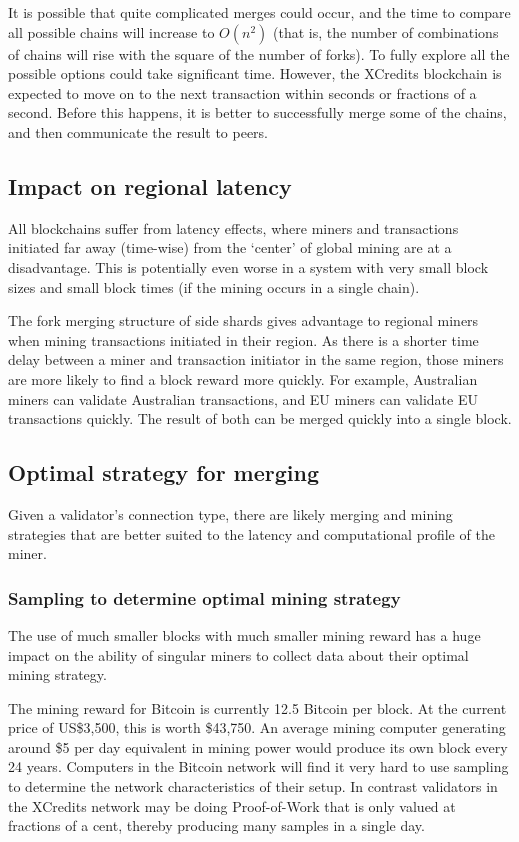 \documentclass[a4paper,12pt]{article}
\begin{document}
It is possible that quite complicated merges could occur, and the time to compare all possible chains will increase to $O(n^2)$ (that is, the number of combinations of chains will rise with the square of the number of forks). To fully explore all the possible options could take significant time. However, the XCredits blockchain is expected to move on to the next transaction within seconds or fractions of a second. Before this happens, it is better to successfully merge some of the chains, and then communicate the result to peers.

\subsection{Impact on regional latency}

All blockchains suffer from latency effects, where miners and transactions initiated far away (time-wise) from the ‘center’ of global mining are at a disadvantage. This is potentially even worse in a system with very small block sizes and small block times (if the mining occurs in a single chain). 

The fork merging structure of side shards gives advantage to regional miners when mining transactions initiated in their region. As there is a shorter time delay between a miner and transaction initiator in the same region, those miners are more likely to find a block reward more quickly. For example, Australian miners can validate Australian transactions, and EU miners can validate EU transactions quickly. The result of both can be merged quickly into a single block.

\subsection{Optimal strategy for merging}
Given a validator's connection type, there are likely merging and mining strategies that are better suited to the latency and computational profile of the miner. 

\subsubsection{Sampling to determine optimal mining strategy}
The use of much smaller blocks with much smaller mining reward has a huge impact on the ability of singular miners to collect data about their optimal mining strategy.

The mining reward for Bitcoin is currently 12.5 Bitcoin per block. At the current price of US\$3,500, this is worth \$43,750. An average mining computer generating around \$5 per day equivalent in mining power would produce its own block every 24 years. Computers in the Bitcoin network will find it very hard to use sampling to determine the network characteristics of their setup. In contrast validators in the XCredits network may be doing Proof-of-Work that is only valued at fractions of a cent, thereby producing many samples in a single day. 
\end{document}
